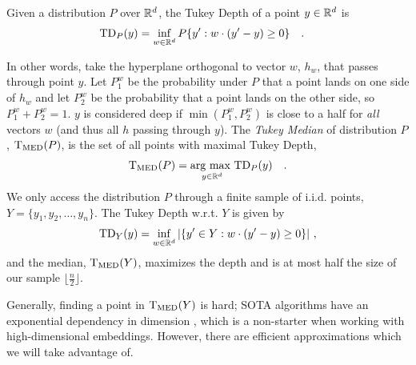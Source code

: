 \begin{definition}
\label{def: tukey} 
	Given a distribution $P$ over ${\mathbb R}^d$, the Tukey Depth of a point $y \in {\mathbb R}^d$ is 
\begin{align*}
	\text{TD}_P(y) 
	&= \inf_{w \in {\mathbb R}^d} P\{y' : w \cdot (y' - y) \geq 0\} \quad. 
\end{align*} 
\end{definition}
In other words, take the hyperplane orthogonal to vector $w$, $h_w$, that passes through point $y$. Let $P_1^w$ be the probability under $P$ that a point lands on one side of $h_w$ and let $P_2^w$ be the probability that a point lands on the other side, so $P_1^w + P_2^w = 1$. $y$ is considered deep if $\min(P_1^w, P_2^w)$ is close to a half for \emph{all} vectors $w$ (and thus all $h$ passing through $y$). The \emph{Tukey Median} of distribution $P$, $\text{T}_{\text{MED}}(P)$, is the set of all points with maximal Tukey Depth, 
\begin{align}
	\text{T}_{\text{MED}}(P) = \underset{y \in {\mathbb R}^d}{\text{arg max }} \text{TD}_P(y) \quad .
	\label{eqn:tukey median}
\end{align}
We only access the distribution $P$ through a finite sample of i.i.d. points, $Y = \{y_1, y_2, \dots, y_n\}$. The Tukey Depth w.r.t. $Y$ is given by 
\begin{align*}
	\text{TD}_Y(y) = \inf_{w \in {\mathbb R}^d} |\{y' \in Y : w \cdot (y' - y) \geq 0\}| \ , 
\end{align*}
and the median, $\text{T}_{\text{MED}}(Y)$, maximizes the depth and is at most half the size of our sample $\big \lfloor \frac{n}{2} \big  \rfloor$. 

Generally, finding a point in $\text{T}_{\text{MED}}(Y)$ is hard; SOTA algorithms have an exponential dependency in dimension \cite{optimal_tukey}, which is a non-starter when working with high-dimensional embeddings. However, there are efficient approximations which we will take advantage of.  









